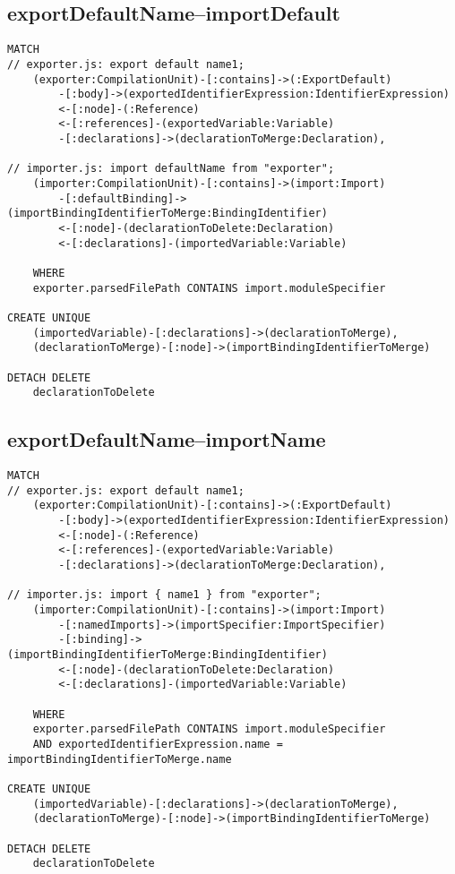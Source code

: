 \newpage
\subsection{exportDefaultName–importDefault}
\begin{lstlisting}[language=Cypher]
MATCH
// exporter.js: export default name1;
    (exporter:CompilationUnit)-[:contains]->(:ExportDefault)
        -[:body]->(exportedIdentifierExpression:IdentifierExpression)
        <-[:node]-(:Reference)
        <-[:references]-(exportedVariable:Variable)
        -[:declarations]->(declarationToMerge:Declaration),

// importer.js: import defaultName from "exporter";
    (importer:CompilationUnit)-[:contains]->(import:Import)
        -[:defaultBinding]->(importBindingIdentifierToMerge:BindingIdentifier)
        <-[:node]-(declarationToDelete:Declaration)
        <-[:declarations]-(importedVariable:Variable)

    WHERE
    exporter.parsedFilePath CONTAINS import.moduleSpecifier

CREATE UNIQUE
    (importedVariable)-[:declarations]->(declarationToMerge),
    (declarationToMerge)-[:node]->(importBindingIdentifierToMerge)

DETACH DELETE
    declarationToDelete
\end{lstlisting}

\newpage
\subsection{exportDefaultName–importName}
\begin{lstlisting}[language=Cypher]
MATCH
// exporter.js: export default name1;
    (exporter:CompilationUnit)-[:contains]->(:ExportDefault)
        -[:body]->(exportedIdentifierExpression:IdentifierExpression)
        <-[:node]-(:Reference)
        <-[:references]-(exportedVariable:Variable)
        -[:declarations]->(declarationToMerge:Declaration),

// importer.js: import { name1 } from "exporter";
    (importer:CompilationUnit)-[:contains]->(import:Import)
        -[:namedImports]->(importSpecifier:ImportSpecifier)
        -[:binding]->(importBindingIdentifierToMerge:BindingIdentifier)
        <-[:node]-(declarationToDelete:Declaration)
        <-[:declarations]-(importedVariable:Variable)

    WHERE
    exporter.parsedFilePath CONTAINS import.moduleSpecifier
    AND exportedIdentifierExpression.name = importBindingIdentifierToMerge.name

CREATE UNIQUE
    (importedVariable)-[:declarations]->(declarationToMerge),
    (declarationToMerge)-[:node]->(importBindingIdentifierToMerge)

DETACH DELETE
    declarationToDelete
\end{lstlisting}

